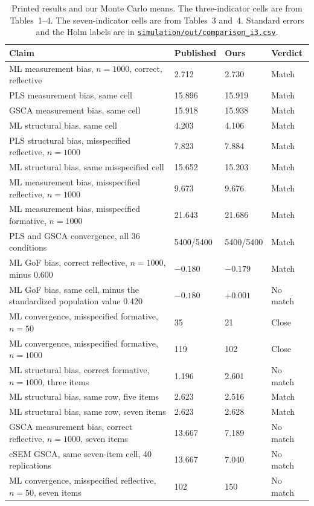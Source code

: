 \documentclass[11pt]{article}
\gdef\linkcsv{\href{https://github.com/alectionary/vibe-math/blob/master/formalization/chumney-sem-small-samples/simulation/out/comparison_i3.csv}{\texttt{simulation/out/comparison_i3.csv}}}
\begin{document}
\begin{table}[ht]
\centering
\caption{Printed results and our Monte Carlo means. The three-indicator
cells are from Tables~1--4. The seven-indicator cells are from Tables~3
and~4. Standard errors and the Holm labels are in
\linkcsv.}
\label{tab:compare}
\small
\begin{tabular}{@{}p{}p{}p{}p{}@{}}
\toprule
Claim & Published & Ours & Verdict \\
\midrule
ML measurement bias, $n=1000$, correct, reflective & 2.712 & 2.730 & Match \\
PLS measurement bias, same cell & 15.896 & 15.919 & Match \\
GSCA measurement bias, same cell & 15.918 & 15.938 & Match \\
ML structural bias, same cell & 4.203 & 4.106 & Match \\
PLS structural bias, misspecified reflective, $n=1000$ & 7.823 & 7.884 & Match \\
ML structural bias, same misspecified cell & 15.652 & 15.203 & Match \\
ML measurement bias, misspecified reflective, $n=1000$ & 9.673 & 9.676 & Match \\
ML measurement bias, misspecified formative, $n=1000$ & 21.643 & 21.686 & Match \\
PLS and GSCA convergence, all 36 conditions & 5400/5400 & 5400/5400 & Match \\
ML GoF bias, correct reflective, $n=1000$, minus 0.600 & $-0.180$ & $-0.179$ & Match \\
ML GoF bias, same cell, minus the standardized population value 0.420 & $-0.180$ & $+0.001$ & No match \\
ML convergence, misspecified formative, $n=50$ & 35 & 21 & Close \\
ML convergence, misspecified formative, $n=1000$ & 119 & 102 & Close \\
ML structural bias, correct formative, $n=1000$, three items & 1.196 & 2.601 & No match \\
ML structural bias, same row, five items & 2.623 & 2.516 & Match \\
ML structural bias, same row, seven items & 2.623 & 2.628 & Match \\
GSCA measurement bias, correct reflective, $n=1000$, seven items & 13.667 & 7.189 & No match \\
cSEM GSCA, same seven-item cell, 40 replications & 13.667 & 7.040 & No match \\
ML convergence, misspecified reflective, $n=50$, seven items & 102 & 150 & No match \\
\bottomrule
\end{tabular}
\end{table}
\end{document}
